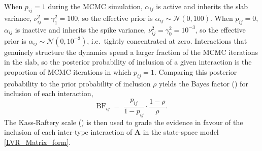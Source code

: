 \documentclass[12pt]{article}
\renewcommand{\thetable}{S\arabic{table}}
\begin{document}
When $p_{ij}=1$ during the MCMC simulation, $\alpha_{ij}$ is active and inherits the slab variance, $\nu_{ij}^{2}=\gamma_{1}^{2}=100$, so the effective prior is $\alpha_{ij}\sim\mathcal{N}(0,100)$. When $p_{ij}=0$, $\alpha_{ij}$ is inactive and inherits the spike variance, $\nu_{ij}^{2}=\gamma_{0}^{2}=10^{-3}$, so the effective prior is $\alpha_{ij}\sim\mathcal{N}(0,10^{-3})$, i.e.\ tightly concentrated at zero. Interactions that genuinely structure the dynamics spend a larger fraction of the MCMC iterations in the slab, so the posterior probability of inclusion of a given interaction is the proportion of MCMC iterations in which $p_{ij}=1$. Comparing this posterior probability to the prior probability of inclusion $\rho$ yields the Bayes factor (\citealp{Kass1995,Almaraz2011,Mutshinda2011}) for inclusion of each interaction,
\begin{equation}\label{BF_ij}
	\mathrm{BF}_{ij} \;=\; \frac{p_{ij}}{1-p_{ij}} \cdot \frac{1-\rho}{\rho}.
\end{equation}
The Kass-Raftery scale (\citealp{Kass1995}) is then used to grade the evidence in favour of the inclusion of each inter-type interaction of $\mathbf{A}$ in the state-space model \eqref{LVR_Matrix_form}.

\newpage

\setcounter{table}{0}
\renewcommand{\thetable}{S\arabic{table}}
\end{document}
